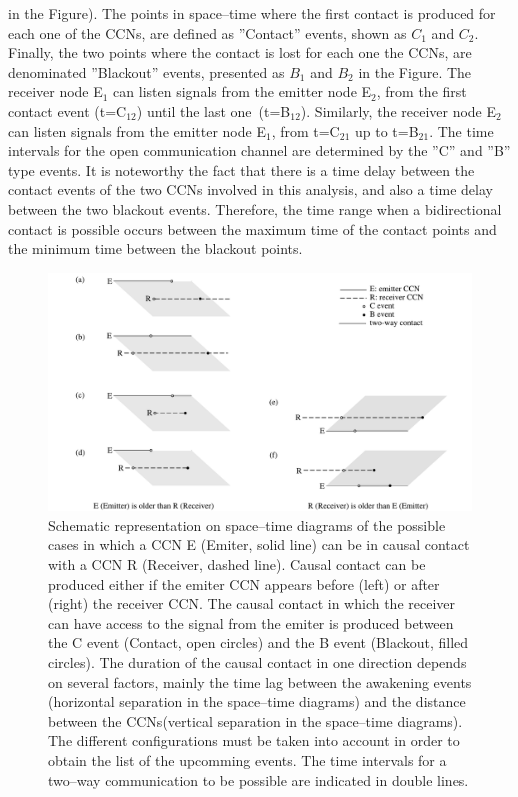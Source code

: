 \documentclass[crop]{CSLB}
\newcommand{\ceti}{CCN}
\newcommand{\cetis}{CCNs}
\begin{document}
in the Figure).
%
The points in space--time where the first contact is produced for each
one of the \cetis{}, are defined as ''Contact'' events, shown as $C_1$
and $C_2$.
%
Finally, the two points where the contact is lost for each one the
\cetis{}, are denominated ''Blackout'' events, presented as $B_1$ and
$B_2$ in the Figure.
%
The receiver node E$_1$ can listen signals from the emitter node
E$_2$, from the first contact event (t=C$_{12}$) until the last
one (t=B$_{12}$).
%
Similarly, the receiver node E$_2$ can listen signals from the emitter
node E$_1$, from t=C$_{21}$ up to t=B$_{21}$.
%
The time intervals for the open communication channel are determined
by the ''C'' and ''B'' type events.
%
It is noteworthy the fact that there is a time delay between the
contact events of the two \cetis{} involved in this analysis, and also
a time delay between the two blackout events.
%
Therefore, the time range when a bidirectional contact is possible
occurs between the maximum time of the contact points and the minimum
time between the blackout points.

      
  
\begin{figure}
   \centering
   \includegraphics[width=\textwidth]{F_messages.pdf}
   \caption{
Schematic representation on space--time diagrams of the possible cases in which a
\ceti{} E (Emiter, solid line) can be in causal contact with a \ceti{} R
(Receiver, dashed line).
%
Causal contact can be produced either if the emiter \ceti{} appears before
(left) or after (right) the receiver \ceti{}.
%
The causal contact in which the receiver can have access to the signal 
from the emiter is produced between the C event (Contact, open circles) and the B
event (Blackout, filled circles).
%
The duration of the causal contact in one direction depends on
several factors, mainly the time lag between the awakening events
(horizontal separation in the space--time diagrams)
and the distance between the \cetis (vertical separation in the
space--time diagrams).
%   
The different configurations must be taken into account in order to 
obtain the list of the upcomming events.
%
The time intervals for a two--way communication to be possible are
indicated in double lines. 
%
   } \label{F_messages}
\end{figure}  
\end{document}
